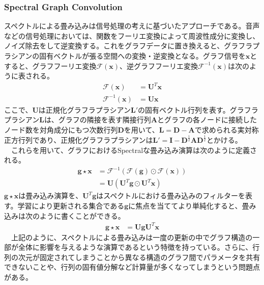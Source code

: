 \subsubsection{Spectral Graph Convolution}
スペクトルによる畳み込みは信号処理の考えに基づいたアプローチである。音声などの信号処理においては、関数をフーリエ変換によって周波性成分に変換し、ノイズ除去をして逆変換する。これをグラフデータに置き換えると、グラフラプラシアンの固有ベクトルが張る空間への変換・逆変換となる。グラフ信号を$\mathbf{x}$とすると、グラフフーリエ変換$\mathscr{F}(\mathbf{x})$、逆グラフフーリエ変換$\mathscr{F}^{-1}(\mathbf{x})$は次のように表される。
\begin{align}
\mathscr{F}(\mathbf{x}) &= \mathbf{U}^T\mathbf{x}\\
\mathscr{F}^{-1}(\mathbf{x}) &= \mathbf{U}\mathbf{x}
\end{align}
ここで、$\mathbf{U}$は正規化グラフラプラシアン$\mathbf{L}'$の固有ベクトル行列を表す。グラフラプラシアン$\mathbf{L}$は、グラフの隣接を表す隣接行列$\mathbf{A}$とグラフの各ノードに接続したノード数を対角成分にもつ次数行列$\mathbf{D}$を用いて、$\mathbf{L} = \mathbf{D}-  \mathbf{A}$で求められる実対称正方行列であり、正規化グラフラプラシアンは$\mathbf{L}' = \mathbf{I} - \mathbf{D}^{\frac{1}{2}} \mathbf{A} \mathbf{D}^{\frac{1}{2}}$とかける。\\
　これらを用いて、グラフにおけるSpectralな畳み込み演算は次のように定義される。
\begin{align}
\mathbf{g} \star \mathbf{x} &= \mathscr{F}^{-1}(\mathscr{F}(\mathbf{g}) \odot \mathscr{F}(\mathbf{x}))\\
&= \mathbf{U}(\mathbf{U}^T \mathbf{g} \odot \mathbf{U}^T \mathbf{x})
\end{align}
$\mathbf{g} \star \mathbf{x}$は畳み込み演算を、$\mathbf{U}^T \mathbf{g}$はスペクトルにおける畳み込みのフィルターを表す。学習により更新される集合である$\mathbf{g}$に焦点を当ててより単純化すると、畳み込みは次のように書くことができる。\\
\begin{align}
\mathbf{g} \star \mathbf{x} &= \mathbf{U} \mathbf{g} \mathbf{U}^T \mathbf{x}
\end{align}
　上記のように、スペクトルによる畳み込みは一度の更新の中でグラフ構造の一部が全体に影響を与えるような演算であるという特徴を持っている。さらに、行列の次元が固定されてしまうことから異なる構造のグラフ間でパラメータを共有できないことや、行列の固有値分解など計算量が多くなってしまうという問題点がある。
